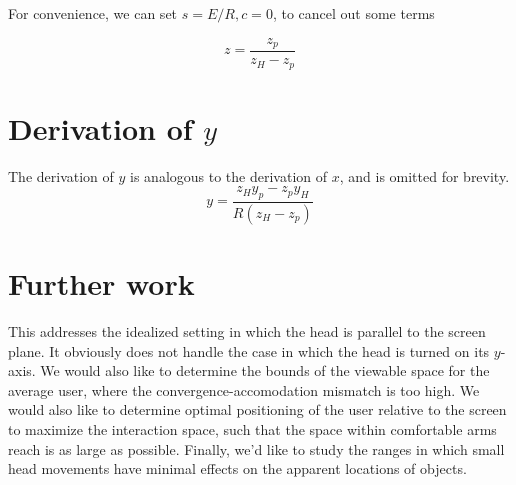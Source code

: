 \documentclass{article}
\begin{document}
For convenience, we can set $s = E/R, c = 0$, to cancel out some terms

$$z = \frac{z_p}{z_H - z_p}$$

\section{Derivation of $y$}
The derivation of $y$ is analogous to the derivation of $x$, and is omitted for brevity.
$$y = \frac{z_Hy_p - z_py_H}{R(z_H - z_p)}$$

\section{Further work}
This addresses the idealized setting in which the head is parallel to the screen plane. It obviously does not handle the case in which the head is turned on its $y$-axis. We would also like to determine the bounds of
the viewable space for the average user, where the convergence-accomodation mismatch is too high. We would also like to determine optimal positioning of the user relative to the screen to maximize the interaction space, such that
the space within comfortable arms reach is as large as possible. Finally, we'd like to study the ranges in which small head movements have minimal effects on the apparent locations of objects.
\end{document}
